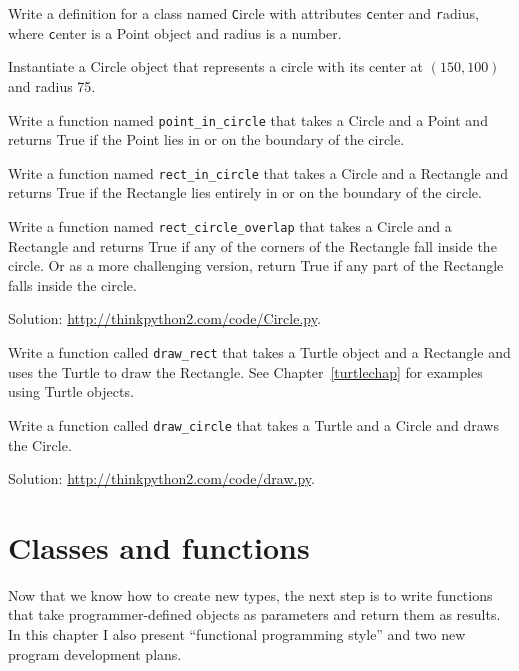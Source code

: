 \documentclass[
DIV=11,
fontsize=13,
twoside,
headinclude=false,
titlepage=firstiscover,
abstract=true,
headsepline=true,
footsepline=true,
chapterprefix=true, %
headings=big,
bibliography=totoc,%
captions=tableheading
]{scrbook}
\theoremstyle{definition}
\begin{document}
\begin{exercise}
\normalfont

Write a definition for a class named {\texttt Circle} with attributes
{\texttt center} and {\texttt radius}, where {\texttt center} is a Point object
and radius is a number.

Instantiate a Circle object that represents a circle with its center
at $(150, 100)$ and radius 75.

Write a function named \verb"point_in_circle" that takes a Circle and
a Point and returns True if the Point lies in or on the boundary of
the circle.

Write a function named \verb"rect_in_circle" that takes a Circle and a
Rectangle and returns True if the Rectangle lies entirely in or on the boundary
of the circle.

Write a function named \verb"rect_circle_overlap" that takes a Circle
and a Rectangle and returns True if any of the corners of the Rectangle fall
inside the circle.  Or as a more challenging version, return True if
any part of the Rectangle falls inside the circle.

Solution: \url{http://thinkpython2.com/code/Circle.py}.

\end{exercise}


\begin{exercise}
\normalfont

Write a function called \verb"draw_rect" that takes a Turtle object
and a Rectangle and uses the Turtle to draw the Rectangle.  See
Chapter~\ref{turtlechap} for examples using Turtle objects.

Write a function called \verb"draw_circle" that takes a Turtle and
a Circle and draws the Circle.

Solution: \url{http://thinkpython2.com/code/draw.py}.

\end{exercise}



\chapter{Classes and functions}
\label{time}

Now that we know how to create new types, the next
step is to write functions that take programmer-defined objects
as parameters and return them as results.  In this chapter I
also present ``functional programming style'' and two new
program development plans.
\end{document}
